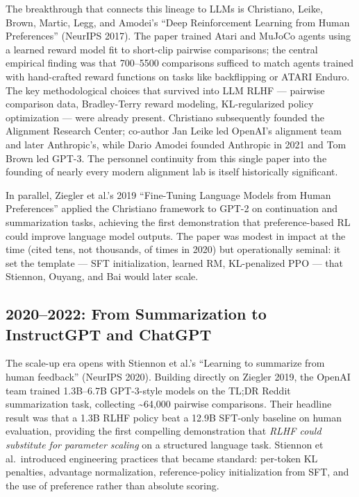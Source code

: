 \documentclass{article}
\begin{document}
The breakthrough that connects this lineage to LLMs is Christiano, Leike, Brown, Martic, Legg, and Amodei's ``Deep Reinforcement Learning from Human Preferences'' (NeurIPS 2017). The paper trained Atari and MuJoCo agents using a learned reward model fit to short-clip pairwise comparisons; the central empirical finding was that 700--5500 comparisons sufficed to match agents trained with hand-crafted reward functions on tasks like backflipping or ATARI Enduro. The key methodological choices that survived into LLM RLHF --- pairwise comparison data, Bradley-Terry reward modeling, KL-regularized policy optimization --- were already present. Christiano subsequently founded the Alignment Research Center; co-author Jan Leike led OpenAI's alignment team and later Anthropic's, while Dario Amodei founded Anthropic in 2021 and Tom Brown led GPT-3. The personnel continuity from this single paper into the founding of nearly every modern alignment lab is itself historically significant.

In parallel, Ziegler et al.'s 2019 ``Fine-Tuning Language Models from Human Preferences'' applied the Christiano framework to GPT-2 on continuation and summarization tasks, achieving the first demonstration that preference-based RL could improve language model outputs. The paper was modest in impact at the time (cited tens, not thousands, of times in 2020) but operationally seminal: it set the template --- SFT initialization, learned RM, KL-penalized PPO --- that Stiennon, Ouyang, and Bai would later scale.

\subsection{2020--2022: From Summarization to InstructGPT and ChatGPT}\label{from-summarization-to-instructgpt-and-chatgpt}

The scale-up era opens with Stiennon et al.'s ``Learning to summarize from human feedback'' (NeurIPS 2020). Building directly on Ziegler 2019, the OpenAI team trained 1.3B--6.7B GPT-3-style models on the TL;DR Reddit summarization task, collecting \textasciitilde64,000 pairwise comparisons. Their headline result was that a 1.3B RLHF policy beat a 12.9B SFT-only baseline on human evaluation, providing the first compelling demonstration that \emph{RLHF could substitute for parameter scaling} on a structured language task. Stiennon et al.~introduced engineering practices that became standard: per-token KL penalties, advantage normalization, reference-policy initialization from SFT, and the use of preference rather than absolute scoring.
\end{document}
